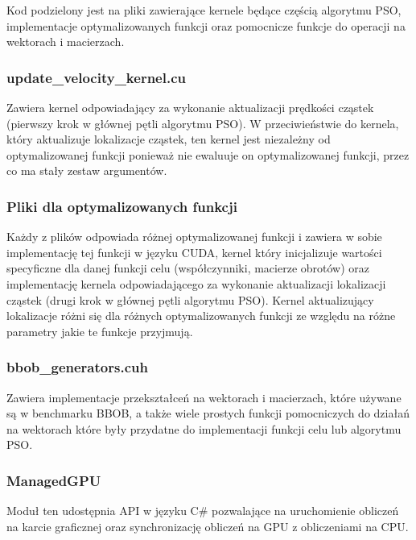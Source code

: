 \documentclass[12pt, twoside, openany, abstract=on]{report}
\theoremstyle{definition}
\begin{document}
Kod podzielony jest na pliki zawierające kernele będące częścią algorytmu PSO, implementacje optymalizowanych funkcji oraz pomocnicze funkcje do operacji na wektorach i macierzach.

\subsubsection{update\_velocity\_kernel.cu} 
Zawiera kernel odpowiadający za wykonanie aktualizacji prędkości cząstek (pierwszy krok w głównej pętli algorytmu PSO). W przeciwieństwie do kernela, który aktualizuje lokalizacje cząstek, ten kernel jest niezależny od optymalizowanej funkcji ponieważ nie ewaluuje on optymalizowanej funkcji, przez co ma stały zestaw argumentów.

\subsubsection{Pliki dla optymalizowanych funkcji} 
Każdy z plików odpowiada różnej optymalizowanej funkcji i zawiera w sobie implementację tej funkcji w języku CUDA, kernel który inicjalizuje wartości specyficzne dla danej funkcji celu (współczynniki, macierze obrotów) oraz implementację kernela odpowiadającego za wykonanie aktualizacji lokalizacji cząstek (drugi krok w głównej pętli algorytmu PSO). Kernel aktualizujący lokalizacje różni się dla różnych optymalizowanych funkcji ze względu na różne parametry jakie te funkcje przyjmują.

\subsubsection{bbob\_generators.cuh} 
Zawiera implementacje przekształceń na wektorach i macierzach, które używane są w benchmarku BBOB, a także wiele prostych funkcji pomocniczych do działań na wektorach które były przydatne do implementacji funkcji celu lub algorytmu PSO.

\newpage

\subsubsection{ManagedGPU}
Moduł ten udostępnia API w języku C\# pozwalające na uruchomienie obliczeń na karcie graficznej oraz synchronizację obliczeń na GPU z obliczeniami na CPU. 
\end{document}
